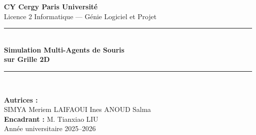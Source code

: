 \begin{titlepage}
\begin{center}
\vspace*{1cm}
{\large\textbf{CY Cergy Paris Université}}\\
\vspace{0.3cm}
{\large Licence 2 Informatique --- Génie Logiciel et Projet}\\
\vspace{2cm}
\rule{\linewidth}{0.5mm}\\[0.4cm]
{\Huge\bfseries\color{bleucours} Simulation Multi-Agents de Souris\\[0.3cm]
sur Grille 2D}\\[0.4cm]
\rule{\linewidth}{0.5mm}\\[1.5cm]


\vspace{1.5cm}
{\large\textbf{Autrices :}}\\[0.3cm]
{\large SIMYA Meriem \quad LAIFAOUI Ines \quad ANOUD Salma}\\
\vspace{1cm}
{\large\textbf{Encadrant :} M. Tianxiao LIU}\\
\vspace{1cm}
{\large Année universitaire 2025--2026}
\end{center}
\end{titlepage}
